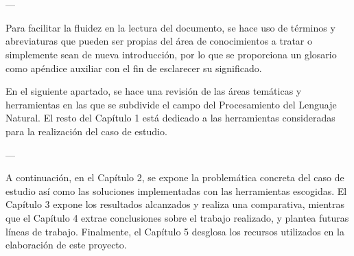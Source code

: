 \chapter{\ChapterOne{}}
\lhead{\emph{\ChapterOne{}}}



---

Para facilitar la fluidez en la lectura del documento, se hace uso de términos y abreviaturas que pueden ser propias del área de conocimientos a tratar o simplemente sean de nueva introducción, por lo que se proporciona un glosario como apéndice auxiliar con el fin de esclarecer su significado.

En el siguiente apartado, se hace una revisión de las áreas temáticas y herramientas en las que se subdivide el campo del Procesamiento del Lenguaje Natural. El resto del Capítulo 1 está dedicado a las herramientas consideradas para la realización del caso de estudio.







---

A continuación, en el Capítulo 2, se expone la problemática concreta del caso de estudio así como las soluciones implementadas con las herramientas escogidas. El Capítulo 3 expone los resultados alcanzados y realiza una comparativa, mientras que el Capítulo 4 extrae conclusiones sobre el trabajo realizado, y plantea futuras líneas de trabajo. Finalmente, el Capítulo 5 desglosa los recursos utilizados en la elaboración de este proyecto.